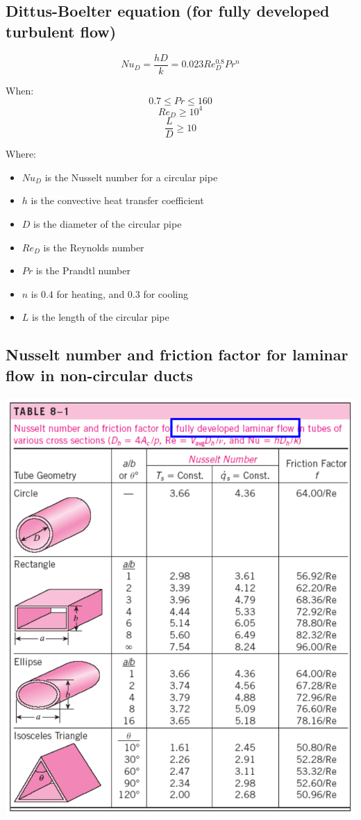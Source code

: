 \documentclass[11pt]{article}
\begin{document}
 \newpage

\subsection{Dittus-Boelter equation (for fully developed turbulent flow)}
\label{sec:org00a24f9}
\[Nu_D = \frac{hD}{k} = 0.023 Re_D^{0.8} Pr^n\]

When:
\[0.7 \le Pr \le 160\]
\[Re_D \ge 10^4\]
\[\frac{L}{D} \ge 10\]

Where:
\begin{itemize}
\item \(Nu_D\) is the Nusselt number for a circular pipe
\item \(h\) is the convective heat transfer coefficient
\item \(D\) is the diameter of the circular pipe
\item \(Re_D\) is the Reynolds number
\item \(Pr\) is the Prandtl number
\item \(n\) is \(0.4\) for heating, and \(0.3\) for cooling
\item \(L\) is the length of the circular pipe
\end{itemize}

\subsection{Nusselt number and friction factor for laminar flow in non-circular ducts}
\label{sec:org0d180b5}
\begin{center}
\includegraphics[width=.9\linewidth]{./images/laminar-flow-in-non-circular-ducts-table.png}
\end{center}
\end{document}
